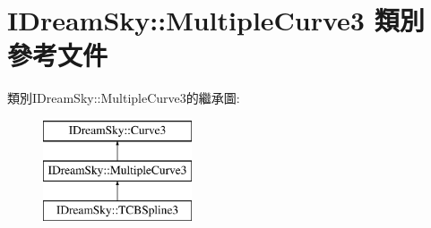 \hypertarget{class_i_dream_sky_1_1_multiple_curve3}{}\section{I\+Dream\+Sky\+:\+:Multiple\+Curve3 類別 參考文件}
\label{class_i_dream_sky_1_1_multiple_curve3}
類別\+I\+Dream\+Sky\+:\+:Multiple\+Curve3的繼承圖\+:\begin{figure}[H]
\begin{center}
\leavevmode
\includegraphics[height=3.000000cm]{class_i_dream_sky_1_1_multiple_curve3}
\end{center}
\end{figure}
